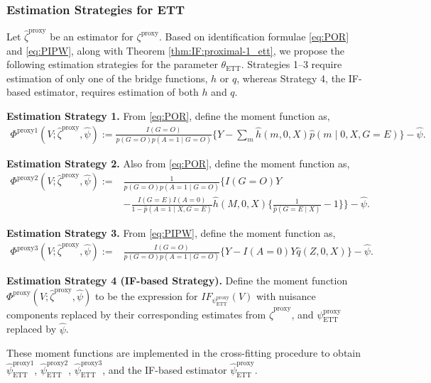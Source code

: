 \documentclass[10pt]{article}
\begin{document}
\subsubsection{Estimation Strategies for ETT}
\label{sec:alt_est_strategy}
Let $\hat\zeta^{\text{proxy}}$ be an estimator for $\zeta^{\text{proxy}}$. Based on identification formulae \eqref{eq:POR} and \eqref{eq:PIPW}, along with Theorem \ref{thm:IF:proximal-1_ett}, we propose the following estimation strategies for the parameter $\theta_{\text{ETT}}$. Strategies 1–3 require estimation of only one of the bridge functions, $h$ or $q$, whereas Strategy 4, the IF-based estimator, requires estimation of both $h$ and $q$.
\begin{itemize}
	
\item{\bf Estimation Strategy 1.} 
From \eqref{eq:POR}, define the moment function as,
{\small
\begin{align*}
\Phi^{\text{proxy1}}(V;\hat{\zeta}^{\text{proxy}},\hat\psi)
\!:=\!
\frac{I(G=O)}{p(G=O)p(A=1\!\mid \!G=O)}\{Y
\!-\!\sum_m\hat{h}(m,0,X)\hat{p}(m\!\mid \!0,X,G=E)\}\!-\!\hat\psi.
\end{align*}
}
\item{\bf Estimation Strategy 2.}
Also from \eqref{eq:POR}, define the moment function as,
{\small
\begin{align*}
\Phi^{\text{proxy2}}(V;\hat{\zeta}^{\text{proxy}},\hat\psi)
:=&
\frac{1}{p(G=O)p(A=1\mid G=O)}\Big\{I(G=O)Y\\
&-\frac{I(G=E)I(A=0)}{1-\hat{p}(A=1\mid X,G=E)}
\hat{h}(M,0,X)\{\frac{1}{\hat{p}(G=E\mid X)}-1\}\Big\}-\hat\psi.
\end{align*}
}
\item{\bf Estimation Strategy 3.}
From \eqref{eq:PIPW}, define the moment function as,
{\small
\begin{align*}
\Phi^{\text{proxy3}}(V;\hat{\zeta}^{\text{proxy}},\hat\psi)
:=&
\frac{I(G=O)}{p(G=O)p(A=1\mid G=O)}\{Y-I(A=0)Y\hat{q}(Z,0,X)\}-\hat\psi.
\end{align*}
}
\begin{sloppypar}
\item{\bf Estimation Strategy 4 (IF-based Strategy).} 
Define the moment function $\Phi^{\text{proxy}}(V; \hat\zeta^{\text{proxy}}, \hat\psi)$ to be the expression for $IF_{\psi^{\text{proxy}}_{\text{ETT}}}(V)$ with nuisance components replaced by their corresponding estimates from $\hat\zeta^{\text{proxy}}$, and $\psi^{\text{proxy}}_{\text{ETT}}$ replaced by $\hat\psi$.
\end{sloppypar}
\end{itemize}
These moment functions are implemented in the cross-fitting procedure to obtain $\hat\psi^{\text{proxy1}}_{\text{ETT}}$, $\hat\psi^{\text{proxy2}}_{\text{ETT}}$, $\hat\psi^{\text{proxy3}}_{\text{ETT}}$, and the IF-based estimator $\hat\psi^{\text{proxy}}_{\text{ETT}}$.
\end{document}

